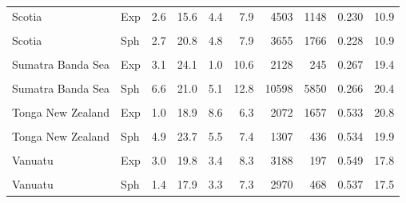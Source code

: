 \begin{ThreePartTable}
\begin{longtable}[t]{llrrrrrrrr}
Scotia & Exp & 2.6 & 15.6 & 4.4 & 7.9 & 4503 & 1148 & 0.230 & 10.9\\
\cellcolor{gray!6}{Scotia} & \cellcolor{gray!6}{Lin} & \cellcolor{gray!6}{3.0} & \cellcolor{gray!6}{23.8} & \cellcolor{gray!6}{3.2} & \cellcolor{gray!6}{8.0} & \cellcolor{gray!6}{1876} & \cellcolor{gray!6}{563} & \cellcolor{gray!6}{0.243} & \cellcolor{gray!6}{10.9}\\
Scotia & Sph & 2.7 & 20.8 & 4.8 & 7.9 & 3655 & 1766 & 0.228 & 10.9\\
\cellcolor{gray!6}{Sumatra Banda Sea} & \cellcolor{gray!6}{Bes} & \cellcolor{gray!6}{3.2} & \cellcolor{gray!6}{20.1} & \cellcolor{gray!6}{1.2} & \cellcolor{gray!6}{10.3} & \cellcolor{gray!6}{1604} & \cellcolor{gray!6}{63} & \cellcolor{gray!6}{0.307} & \cellcolor{gray!6}{}\\
Sumatra Banda Sea & Exp & 3.1 & 24.1 & 1.0 & 10.6 & 2128 & 245 & 0.267 & 19.4\\
\cellcolor{gray!6}{Sumatra Banda Sea} & \cellcolor{gray!6}{Lin} & \cellcolor{gray!6}{6.6} & \cellcolor{gray!6}{23.0} & \cellcolor{gray!6}{5.8} & \cellcolor{gray!6}{12.1} & \cellcolor{gray!6}{4199} & \cellcolor{gray!6}{1547} & \cellcolor{gray!6}{0.266} & \cellcolor{gray!6}{20.4}\\
Sumatra Banda Sea & Sph & 6.6 & 21.0 & 5.1 & 12.8 & 10598 & 5850 & 0.266 & 20.4\\
\cellcolor{gray!6}{Tonga New Zealand} & \cellcolor{gray!6}{Bes} & \cellcolor{gray!6}{5.6} & \cellcolor{gray!6}{17.2} & \cellcolor{gray!6}{7.0} & \cellcolor{gray!6}{7.5} & \cellcolor{gray!6}{1566} & \cellcolor{gray!6}{186} & \cellcolor{gray!6}{0.531} & \cellcolor{gray!6}{40.7}\\
Tonga New Zealand & Exp & 1.0 & 18.9 & 8.6 & 6.3 & 2072 & 1657 & 0.533 & 20.8\\
\cellcolor{gray!6}{Tonga New Zealand} & \cellcolor{gray!6}{Lin} & \cellcolor{gray!6}{3.7} & \cellcolor{gray!6}{24.9} & \cellcolor{gray!6}{3.6} & \cellcolor{gray!6}{10.1} & \cellcolor{gray!6}{1293} & \cellcolor{gray!6}{321} & \cellcolor{gray!6}{0.521} & \cellcolor{gray!6}{23.8}\\
Tonga New Zealand & Sph & 4.9 & 23.7 & 5.5 & 7.4 & 1307 & 436 & 0.534 & 19.9\\
\cellcolor{gray!6}{Vanuatu} & \cellcolor{gray!6}{Bes} & \cellcolor{gray!6}{3.0} & \cellcolor{gray!6}{20.5} & \cellcolor{gray!6}{3.6} & \cellcolor{gray!6}{10.3} & \cellcolor{gray!6}{3101} & \cellcolor{gray!6}{113} & \cellcolor{gray!6}{0.518} & \cellcolor{gray!6}{59.5}\\
Vanuatu & Exp & 3.0 & 19.8 & 3.4 & 8.3 & 3188 & 197 & 0.549 & 17.8\\
\cellcolor{gray!6}{Vanuatu} & \cellcolor{gray!6}{Lin} & \cellcolor{gray!6}{1.2} & \cellcolor{gray!6}{20.4} & \cellcolor{gray!6}{2.6} & \cellcolor{gray!6}{10.8} & \cellcolor{gray!6}{2918} & \cellcolor{gray!6}{286} & \cellcolor{gray!6}{0.517} & \cellcolor{gray!6}{54.6}\\
Vanuatu & Sph & 1.4 & 17.9 & 3.3 & 7.3 & 2970 & 468 & 0.537 & 17.5\\*
\end{longtable}
\end{ThreePartTable}
\endgroup{}

